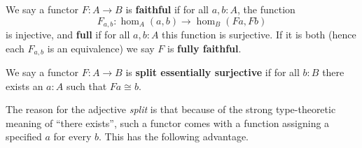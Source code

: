 \documentclass{mscs}
\numberwithin{equation}{section}
\begin{document}
\begin{defn}
  We say a functor $F:A\to B$ is \textbf{faithful} if for all $a,b:A$, the function
  \[F_{a,b}:\hom_A(a,b) \to \hom_B(Fa,Fb)\]
  is injective, and \textbf{full} if for all $a,b:A$ this function is surjective.
  If it is both (hence each $F_{a,b}$ is an equivalence) we say $F$ is \textbf{fully faithful}.
\end{defn}

\begin{defn}
  We say a functor $F:A\to B$ is \textbf{split essentially surjective} if for all $b:B$ there exists an $a:A$ such that $Fa\cong b$.
\end{defn}

The reason for the adjective \emph{split} is that because of the strong type-theoretic meaning of ``there exists'', such a functor comes with a function assigning a specified $a$ for every $b$.
This has the following advantage.
\end{document}
